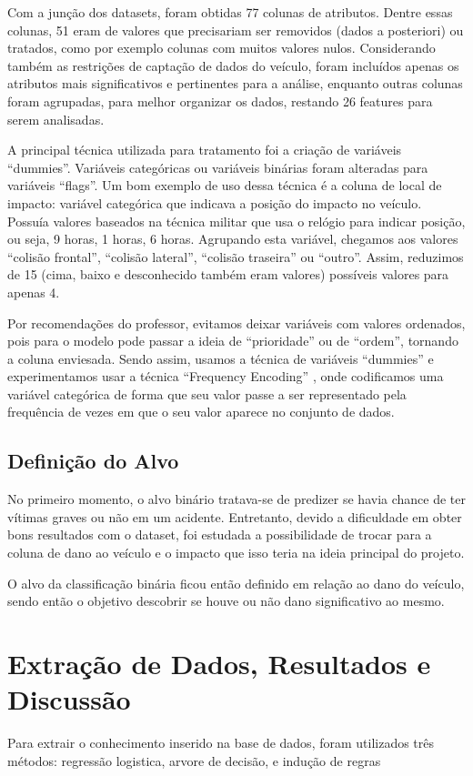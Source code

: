 \documentclass[conference]{IEEEtran}
\begin{document}
Com a junção dos datasets, foram obtidas 77 colunas de atributos. Dentre essas colunas, 51 eram de valores que precisariam ser removidos (dados a posteriori) ou tratados, como por exemplo colunas com muitos valores nulos. Considerando também as restrições de captação de dados do veículo, foram incluídos apenas os atributos mais significativos e pertinentes para a análise, enquanto outras colunas foram agrupadas, para melhor organizar os dados, restando 26 features para serem analisadas.

A principal técnica utilizada para tratamento foi a criação de variáveis “dummies”\cite{dummy}. Variáveis categóricas ou variáveis binárias foram alteradas para variáveis “flags”. Um bom exemplo de uso dessa técnica é a coluna de local de impacto: variável categórica que indicava a posição do impacto no veículo. Possuía valores baseados na técnica militar que usa o relógio para indicar posição, ou seja, 9 horas, 1 horas, 6 horas. Agrupando esta variável, chegamos aos valores “colisão frontal”, “colisão lateral”, “colisão traseira” ou “outro”. Assim, reduzimos de 15 (cima, baixo e desconhecido também eram valores) possíveis valores para apenas 4.

Por recomendações do professor, evitamos deixar variáveis com valores ordenados, pois para o modelo pode passar a ideia de “prioridade” ou de “ordem”, tornando a coluna enviesada. Sendo assim, usamos a técnica de variáveis “dummies”\cite{dummy} e experimentamos usar a técnica “Frequency Encoding”\cite{encoding} , onde codificamos uma variável categórica de forma que seu valor passe a ser representado pela frequência de vezes em que o seu valor aparece no conjunto de dados.


\subsection{Definição do Alvo}
No primeiro momento, o alvo binário tratava-se de predizer se havia chance de ter vítimas graves ou não em um acidente. Entretanto, devido a dificuldade em obter bons resultados com o dataset, foi estudada a possibilidade de trocar para a coluna de dano ao veículo e o impacto que isso teria na ideia principal do projeto.

O alvo da classificação binária ficou então definido em relação ao dano do veículo, sendo então o objetivo descobrir se houve ou não dano significativo ao mesmo.

\section{Extração de Dados, Resultados e Discussão}
Para extrair o conhecimento inserido na base de dados, 
foram utilizados três métodos: regressão logistica, arvore de decisão, e indução de regras
\end{document}
